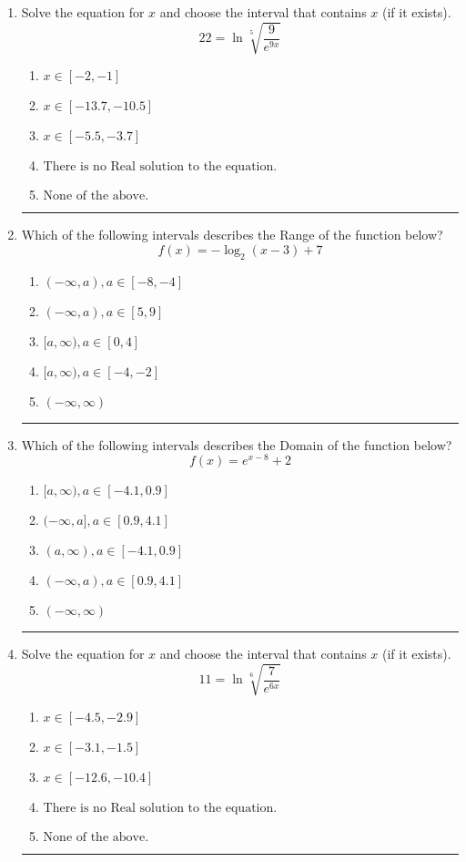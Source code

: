\documentclass[14pt]{extbook}
\newcommand{\litem}[1]{\item#1\hspace*{-1cm}\rule{\textwidth}{0.4pt}}
\begin{document}
\begin{enumerate}
{\begin{enumerate}[label=\Alph*.]
\end{enumerate} }
\litem{
 Solve the equation for $x$ and choose the interval that contains $x$ (if it exists).\[  22 = \ln{\sqrt[5]{\frac{9}{e^{9x}}}} \]\begin{enumerate}[label=\Alph*.]
\item \( x \in [-2, -1] \)
\item \( x \in [-13.7, -10.5] \)
\item \( x \in [-5.5, -3.7] \)
\item \( \text{There is no Real solution to the equation.} \)
\item \( \text{None of the above.} \)

\end{enumerate} }
\litem{
Which of the following intervals describes the Range of the function below?\[ f(x) = -\log_2{(x-3)}+7 \]\begin{enumerate}[label=\Alph*.]
\item \( (-\infty, a), a \in [-8, -4] \)
\item \( (-\infty, a), a \in [5, 9] \)
\item \( [a, \infty), a \in [0, 4] \)
\item \( [a, \infty), a \in [-4, -2] \)
\item \( (-\infty, \infty) \)

\end{enumerate} }
\litem{
Which of the following intervals describes the Domain of the function below?\[ f(x) = e^{x-8}+2 \]\begin{enumerate}[label=\Alph*.]
\item \( [a, \infty), a \in [-4.1, 0.9] \)
\item \( (-\infty, a], a \in [0.9, 4.1] \)
\item \( (a, \infty), a \in [-4.1, 0.9] \)
\item \( (-\infty, a), a \in [0.9, 4.1] \)
\item \( (-\infty, \infty) \)

\end{enumerate} }
\litem{
 Solve the equation for $x$ and choose the interval that contains $x$ (if it exists).\[  11 = \ln{\sqrt[6]{\frac{7}{e^{6x}}}} \]\begin{enumerate}[label=\Alph*.]
\item \( x \in [-4.5, -2.9] \)
\item \( x \in [-3.1, -1.5] \)
\item \( x \in [-12.6, -10.4] \)
\item \( \text{There is no Real solution to the equation.} \)
\item \( \text{None of the above.} \)


\end{enumerate}}
\end{enumerate}
\end{document}
